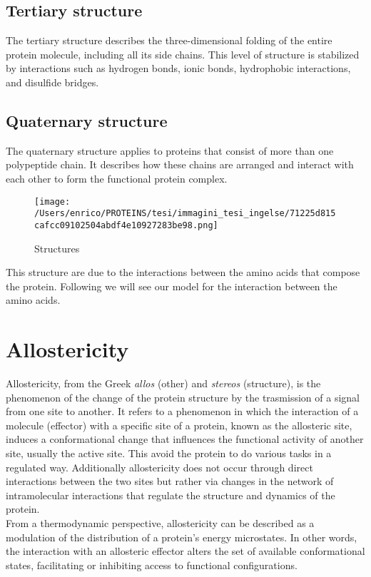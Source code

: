 \documentclass[English, Lau, oneside]{sapthesis}
\begin{document}
\subsection{Tertiary structure}
\noindent The tertiary structure describes the three-dimensional folding of the entire protein molecule, including all its side chains. This level of structure is stabilized by interactions such as hydrogen bonds, ionic bonds, hydrophobic interactions, and disulfide bridges.

\subsection{Quaternary structure}
\noindent The quaternary structure applies to proteins that consist of more than one polypeptide chain. It describes how these chains are arranged and interact with each other to form the functional protein complex.
\begin{figure}[H]
    \centering
    \texttt{[image: /Users/enrico/PROTEINS/tesi/immagini\_tesi\_ingelse/71225d815cafcc09102504abdf4e10927283be98.png]}
    \caption{Structures}
\end{figure}

This structure are due to the interactions between the amino acids that compose the protein. 
Following we will see our model for the interaction between the amino acids.
\newpage
\section{Allostericity}
\noindent Allostericity, from the Greek \textit{allos} (other) and \textit{stereos} (structure), is the phenomenon of the change of the protein structure by the trasmission of a signal from one site to another.\cite{ref5}
It refers to a phenomenon in which the interaction of a molecule (effector) with a specific site of a protein, known as the allosteric site, induces a conformational change that influences the functional activity of another site, usually the active site. 
This avoid the protein to do various tasks in a regulated way.
Additionally allostericity does not occur through direct interactions between the two sites but rather via changes in the network of intramolecular interactions that regulate the structure and dynamics of the protein.\\
From a thermodynamic perspective, allostericity can be described as a modulation of the distribution of a protein's energy microstates. 
In other words, the interaction with an allosteric effector alters the set of available conformational states, facilitating or inhibiting access to functional configurations.\cite{ref6}
\end{document}
